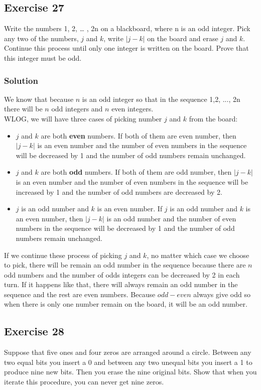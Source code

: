 \documentclass{article}
\begin{document}
\subsection*{Exercise 27}
Write the numbers 1, 2, … , 2n on a blackboard, where n is an odd integer. Pick any two of the numbers, $j$ and $k$, write $|j - k|$ on the board and erase $j$ and $k$. Continue this process until only one integer is written on the board. Prove that this integer must be odd.
\subsubsection*{Solution}
We know that because $n$ is an odd integer so that in the sequence 1,2, ..., 2n there will be $n$ odd integers and $n$ even integers.\\

WLOG, we will have three cases of picking number $j$ and $k$ from the board:
\begin{itemize}
    \item $j$ and $k$ are both \textbf{even} numbers. If both of them are even number, then $|j - k|$ is an even number and the number of even numbers in the sequence will be decreased by 1 and the number of odd numbers remain unchanged.
    \item $j$ and $k$ are both \textbf{odd} numbers. If both of them are odd number, then $|j - k|$ is an even number and the number of even numbers in the sequence will be increased by 1 and the number of odd numbers are decreased by 2.
    \item $j$ is an odd number and $k$ is an even number. If $j$ is an odd number and $k$ is an even number, then $|j - k|$ is an odd number and the number of even numbers in the sequence will be decreased by 1 and the number of odd numbers remain unchanged.
\end{itemize}

If we continue these process of picking $j$ and $k$, no matter which case we choose to pick, there will be remain an odd number in the sequence because there are $n$ odd numbers and the number of odds integers can be decreased by 2 in each turn. If it happens like that, there will always remain an odd number in the sequence and the rest are even numbers. Because $odd - even$ always give odd so when there is only one number remain on the board, it will be an odd number.
\subsection*{Exercise 28}
Suppose that five ones and four zeros are arranged around a circle. Between any two equal bits you insert a 0 and between any two unequal bits you insert a 1 to produce nine new bits. Then you erase the nine original bits. Show that when you iterate this procedure, you can never get nine zeros.
\end{document}
